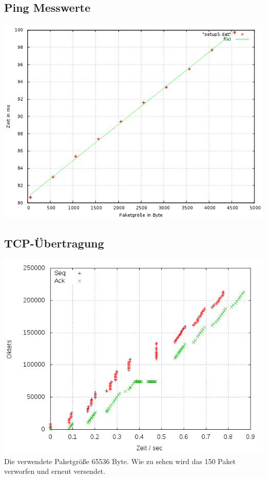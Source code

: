 \documentclass[a4paper,10pt]{article}
\begin{document}
\subsection{Ping Messwerte}
\includegraphics[scale=0.75]{ping_setup_wan3.png}

\subsection{TCP-Übertragung}
\includegraphics[scale=0.75]{setup_wan3.png}
Die verwendete Paketgröße 65536 Byte.
Wie zu sehen wird das 150 Paket verworfen und erneut versendet.
\end{document}
